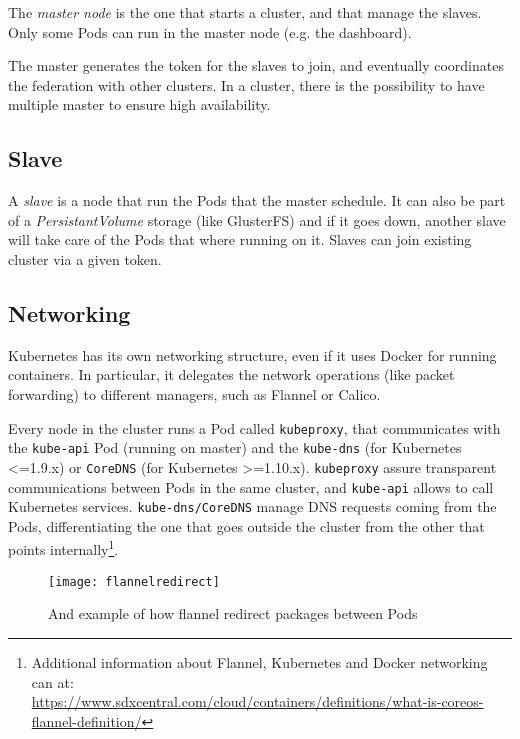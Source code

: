 The \emph{master node} is the one that starts a cluster, and that manage the
slaves. Only some Pods can run in the master node (e.g. the dashboard).

The master generates the token for the slaves to join, and eventually
coordinates the federation with other clusters. In a cluster, there is the
possibility to have multiple master to ensure high availability.

\subsection{Slave}
\label{slave}

A \emph{slave} is a node that run the Pods that the master schedule. It can
also be part of a \emph{PersistantVolume} storage (like GlusterFS) and if it
goes down, another slave will take care of the Pods that where running on
it. Slaves can join existing cluster via a given token.

\subsection{Networking}
\label{networking}

Kubernetes has its own networking structure, even if it uses Docker for running
containers. In particular, it delegates the network operations (like packet
forwarding) to different managers, such as Flannel or Calico.

Every node in the cluster runs a Pod called \texttt{kubeproxy}, that
communicates with the \texttt{kube-api} Pod (running on master) and
the \texttt{kube-dns} (for Kubernetes \textless{}=1.9.x) or
\texttt{CoreDNS} (for Kubernetes \textgreater{}=1.10.x). \texttt{kubeproxy}
assure transparent communications between Pods in the same cluster, and
\texttt{kube-api} allows to call Kubernetes services. \texttt{kube-dns/CoreDNS} 
manage DNS requests coming from the Pods, differentiating the one that goes 
outside the cluster from the other that points internally\footnote{Additional
information about Flannel, Kubernetes and Docker networking can at:\\
\sloppy
\url{https://www.sdxcentral.com/cloud/containers/definitions/what-is-coreos-flannel-definition/}}.

\begin{figure}[htbp]
\centering
\texttt{[image: flannelredirect]}
\caption{And example of how flannel redirect packages between Pods}
\end{figure}



